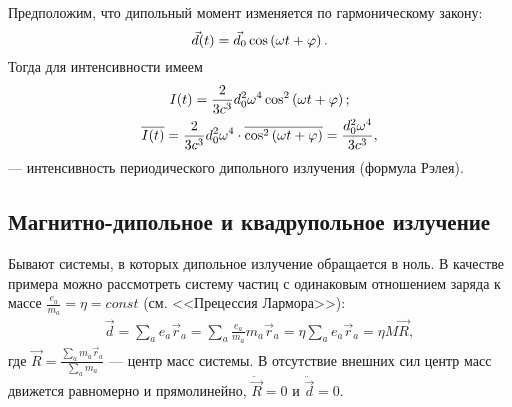     Предположим, что дипольный момент изменяется по гармоническому закону:
    \[
        \vec{d}(t) = \vec{d}_0\cos\left({\omega t + \varphi}\right).
    \]
    Тогда для интенсивности имеем
    \begin{gather*}
        I(t) = \frac{2}{3c^3} d_0^2 \omega^4 \cos^2\left({\omega t + \varphi}\right);\\
        \overline{I(t)} = \frac{2}{3c^3} d_0^2 \omega^4 \cdot \overline{\cos^2\left({\omega t + \varphi}\right)} = \frac{d_0^2\omega^4}{3c^3},
    \end{gather*}
    --- интенсивность периодического дипольного излучения (формула Рэлея).

\subsection{Магнитно-дипольное и квадрупольное излучение}
    Бывают системы, в которых дипольное излучение обращается в ноль. В качестве примера можно рассмотреть систему частиц с одинаковым
    отношением заряда к массе $\frac{e_a}{m_a} = \eta = const$ (см. <<Прецессия Лармора>>):
    \begin{gather*}
        \vec{d} = \sum_a e_a\vec{r}_a = \sum_a \frac{e_a}{m_a}m_a\vec{r}_a = \eta\sum_ae_a\vec{r}_a = \eta M \vec{R},
    \end{gather*}
    где $ \vec{R} = \frac{\sum_am_a\vec{r}_a}{\sum_am_a}$ --- центр масс системы. В отсутствие внешних сил центр масс движется
    равномерно и прямолинейно, $\ddot{\vec{R}} = 0$ и $\ddot{\vec{d}} = 0$.

